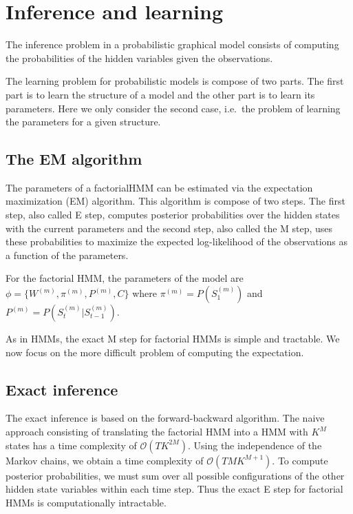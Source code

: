 \documentclass{article}
\begin{document}
\section{Inference and learning}

The inference problem in a probabilistic graphical model consists of computing the probabilities of the hidden variables given the observations.

The learning problem for probabilistic models is compose of two parts. The first part is to learn the structure of a model and the other part is to learn its parameters. Here we only consider the second case, i.e.\ the problem of learning the parameters for a given structure. 

\subsection{The EM algorithm}

The parameters of a factorialHMM can be estimated via the expectation maximization (EM) algorithm. This algorithm is compose of two steps. The first step, also called E step, computes posterior probabilities over the hidden states with the current parameters and the second step, also called the M step, uses these probabilities to maximize the expected log-likelihood of the observations as a function of the parameters.

For the factorial HMM, the parameters of the model are $\phi = \{ W^{(m)}, \pi^{(m)}, P^{(m)}, C \}$ where $\pi^{(m)} = P(S_1^{(m)})$ and $P^{(m)} = P(S_t^{(m)} | S_{t-1}^{(m)})$. 

As in HMMs, the exact M step for factorial HMMs is simple and tractable. We now focus on the more difficult problem of computing the expectation.

\subsection{Exact inference}

The exact inference is based on the forward-backward algorithm. The naive approach consisting of translating the factorial HMM into a HMM with $K^M$ states has a time complexity of $\mathcal{O}(T K^{2M})$. Using the independence of the Markov chains, we obtain a time complexity of $\mathcal{O}(T M K^{M+1})$. To compute posterior probabilities, we must sum over all possible configurations of the other hidden state variables within each time step. Thus the exact E step for factorial HMMs is computationally intractable.
\end{document}

